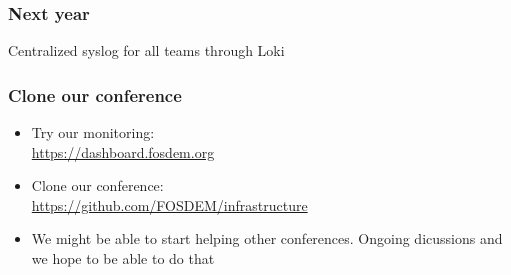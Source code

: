 \documentclass[aspectratio=169]{beamer}
\begin{document}
\begin{frame}
	\frametitle{Next year}
	\vfill
	Centralized syslog for all teams through Loki
	\vfill
\end{frame}


\begin{frame}
	\frametitle{Clone our conference}
	\vfill
	\begin{itemize}
		\item Try our monitoring: \\ \url{https://dashboard.fosdem.org}
		\item Clone our conference: \\ \url{https://github.com/FOSDEM/infrastructure}
		\item We might be able to start helping other conferences. Ongoing dicussions and we hope to be able to do that
	\end{itemize}
	\vfill
\end{frame}
\end{document}
